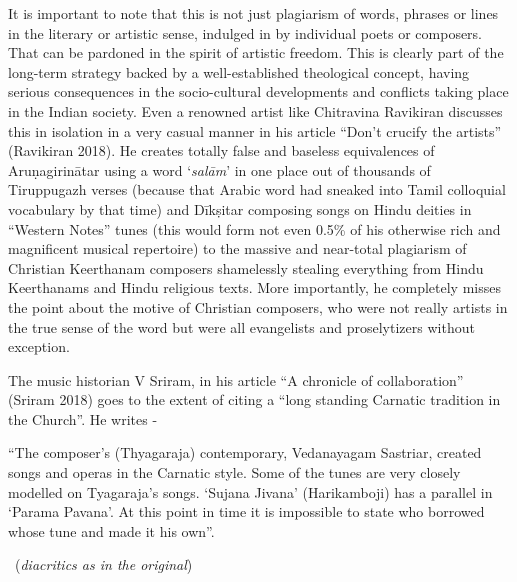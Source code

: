 It is important to note that this is not just plagiarism of words, phrases or lines in the literary or artistic sense, indulged in by individual poets or composers. That can be pardoned in the spirit of artistic freedom. This is clearly part of the long-term strategy backed by a well-established theological concept, having serious consequences in the socio-cultural developments and conflicts taking place in the Indian society. Even a renowned artist like Chitravina Ravikiran discusses this in isolation in a very casual manner in his article “Don’t crucify the artists” (Ravikiran 2018). He creates totally false and baseless equivalences of Aruṇagirinātar using a word ‘\textit{salām}’ in one place out of thousands of Tiruppugazh verses (because that Arabic word had sneaked into Tamil colloquial vocabulary by that time) and Dīkṣitar composing songs on Hindu deities in “Western Notes” tunes (this would form not even 0.5\% of his otherwise rich and magnificent musical repertoire) to the massive and near-total plagiarism of Christian Keerthanam composers shamelessly stealing everything from Hindu Keerthanams and Hindu religious texts. More importantly, he completely misses the point about the motive of Christian composers, who were not really artists in the true sense of the word but were all evangelists and proselytizers without exception.

The music historian V Sriram, in his article “A chronicle of collaboration” (Sriram 2018) goes to the extent of citing a “long standing Carnatic tradition in the Church”. He writes -

\begin{myquote}
“The composer’s (Thyagaraja) contemporary, Vedanayagam Sastriar, created songs and operas in the Carnatic style. Some of the tunes are very closely modelled on Tyagaraja’s songs. ‘Sujana Jivana’ (Harikamboji) has a parallel in ‘Parama Pavana’. At this point in time it is impossible to state who borrowed whose tune and made it his own”. 

~\hfill (\textit{diacritics as in the original})
\end{myquote}

